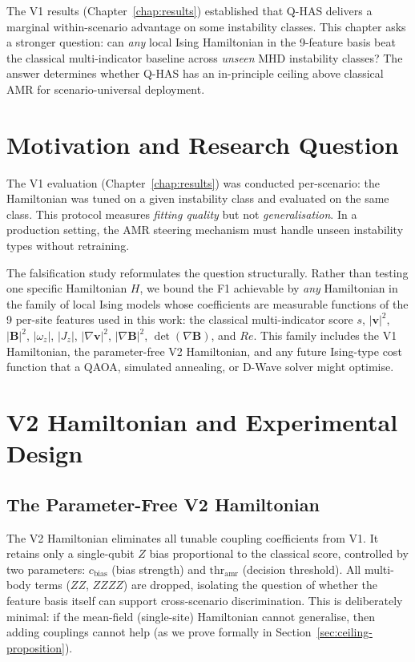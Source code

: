 \documentclass[12pt, a4paper, oneside]{report}
\begin{document}
The V1 results (Chapter~\ref{chap:results}) established that Q-HAS delivers a marginal within-scenario advantage on some instability classes. This chapter asks a stronger question: can \textit{any} local Ising Hamiltonian in the 9-feature basis beat the classical multi-indicator baseline across \textit{unseen} MHD instability classes? The answer determines whether Q-HAS has an in-principle ceiling above classical AMR for scenario-universal deployment.

\section{Motivation and Research Question}
\label{sec:falsification-motivation}

The V1 evaluation (Chapter~\ref{chap:results}) was conducted per-scenario: the Hamiltonian was tuned on a given instability class and evaluated on the same class. This protocol measures \textit{fitting quality} but not \textit{generalisation}. In a production setting, the AMR steering mechanism must handle unseen instability types without retraining.

The falsification study reformulates the question structurally. Rather than testing one specific Hamiltonian $H$, we bound the F1 achievable by \textit{any} Hamiltonian in the family of local Ising models whose coefficients are measurable functions of the 9 per-site features used in this work: the classical multi-indicator score $s$, $|\mathbf{v}|^2$, $|\mathbf{B}|^2$, $|\omega_z|$, $|J_z|$, $|\nabla \mathbf{v}|^2$, $|\nabla \mathbf{B}|^2$, $\det(\nabla \mathbf{B})$, and $Re$. This family includes the V1 Hamiltonian, the parameter-free V2 Hamiltonian, and any future Ising-type cost function that a QAOA, simulated annealing, or D-Wave solver might optimise.

\section{V2 Hamiltonian and Experimental Design}
\label{sec:v2-hamiltonian}

\subsection{The Parameter-Free V2 Hamiltonian}

The V2 Hamiltonian eliminates all tunable coupling coefficients from V1. It retains only a single-qubit $Z$ bias proportional to the classical score, controlled by two parameters: $c_\text{bias}$ (bias strength) and $\text{thr}_\text{amr}$ (decision threshold). All multi-body terms ($ZZ$, $ZZZZ$) are dropped, isolating the question of whether the feature basis itself can support cross-scenario discrimination. This is deliberately minimal: if the mean-field (single-site) Hamiltonian cannot generalise, then adding couplings cannot help (as we prove formally in Section~\ref{sec:ceiling-proposition}).
\end{document}
